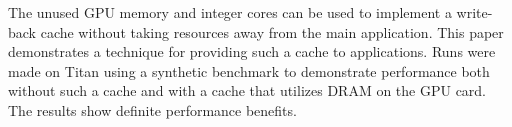 The unused GPU memory and integer cores can be used to implement a write-back cache without taking resources away from the main application.  This paper demonstrates a technique for providing such a cache to applications.   Runs were made on Titan using a synthetic benchmark to demonstrate performance both without such a cache and with a cache that utilizes DRAM on the GPU card. The results show definite performance benefits.
 
%
%
\begin{comment}

Specifically, though AMD markets the processor as having 16 cores, it actually has only 8 floating-point units. As such, some applications that are floating-point intensive run with only 8 processes per node. This actually leaves 8 cores available so long as they primarily execute integer instructions. Furthermore, some applications do not make use of the GPU and thus it, and the ram attached to it, also go unused.

Since the GPU memory is accessed via the PCIe bus, it is generally not practical to use it as part of a process's main memory. Its bandwidth is too low and its latency is too high. However, when compared to filesystem performance - even a very fast parallel filesystem - accessing this memory is still very fast. Tests on Titan show that writing to GPU memory is at least eight times faster than writing to the filesystem, and considerably better than that if the filesystem is under heavy load. This suggests that using this memory as a large write-back cache for file I/O might help application runtimes significantly.

In HPC applications, most filesystem writes follow a very ?bursty? pattern. That is, there will be long periods with no file output while the application is in a compute phase, followed by a short period of intense output when the application writes its checkpoint or output files. Furthermore, at ORNL, the filesystem is a shared resource and other users will also be putting a varying load on it. This means that the performance that a user sees at any given time will likely vary dramatically.

Having a sufficiently large write-back cache would alleviate both of these problems. Assuming the cache is large enough, then the `bursty' nature of the output pattern can be smoothed out since there will be time for the traffic to drain from the cache before the next burst arrives. Equally importantly, write performance should be more predictable. From the application's point of view, write speed is only limited by how fast data can be copied into the cache, and that is not effected by outside influences. The GPU memory and integer cores can be used to implement such a cache without taking resources away from the main application.


\end{comment}
